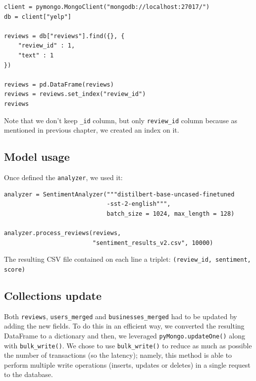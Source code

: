 \documentclass{Configuration_Files/PoliMi3i_thesis}
\begin{document}
\bigskip

\begin{verbatim}
client = pymongo.MongoClient("mongodb://localhost:27017/")
db = client["yelp"]

reviews = db["reviews"].find({}, {
    "review_id" : 1,
    "text" : 1
})

reviews = pd.DataFrame(reviews)
reviews = reviews.set_index("review_id")
reviews
\end{verbatim}

\bigskip

Note that we don't keep \texttt{\_id} column, but only \texttt{review\_id} column because as mentioned in previous chapter, we created an index on it.  

\subsection{Model usage}
Once defined the \texttt{analyzer}, we used it:

\bigskip

\begin{verbatim}
analyzer = SentimentAnalyzer("""distilbert-base-uncased-finetuned
                             -sst-2-english""", 
                             batch_size = 1024, max_length = 128)

analyzer.process_reviews(reviews, 
                         "sentiment_results_v2.csv", 10000)
\end{verbatim}

\bigskip

The resulting CSV file contained on each line a triplet: \texttt{(review\_id, sentiment, \\score)}

\subsection{Collections update}
Both \texttt{reviews}, \texttt{users\_merged} and \texttt{businesses\_merged} had to be updated by adding the new fields. To do this in an efficient way, we converted the resulting DataFrame to a dictionary and then, we leveraged  \texttt{pyMongo.updateOne()} along with \texttt{bulk\_write()}. We chose to use \texttt{bulk\_write()} to reduce as much as possible the number of transactions (so the latency); namely, this method is able to perform multiple write operations (inserts, updates or deletes) in a single request to the database. 
\end{document}

